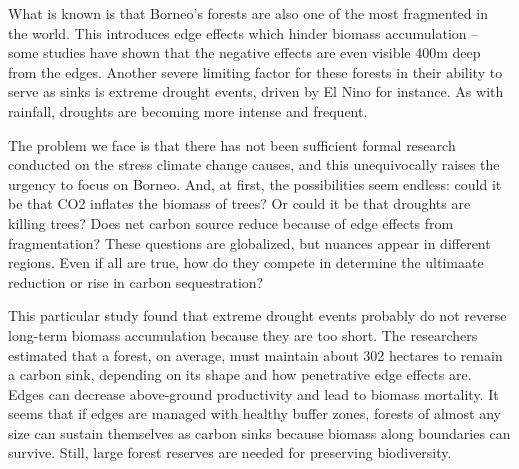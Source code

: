 What is known is that Borneo's forests are also one of the most fragmented in the world. This introduces edge effects which hinder biomass accumulation -- some studies have shown that the negative effects are even visible 400m deep from the edges. Another severe limiting factor for these forests in their ability to serve as sinks is extreme drought events, driven by El Nino for instance. As with rainfall, droughts are becoming more intense and frequent. 

The problem we face is that there has not been sufficient formal research conducted on the stress climate change causes, and this unequivocally raises the urgency to focus on Borneo. And, at first, the possibilities seem endless: could it be that CO2 inflates the biomass of trees? Or could it be that droughts are killing trees? Does net carbon source reduce because of edge effects from fragmentation? These questions are globalized, but nuances appear in different regions. Even if all are true, how do they compete in determine the ultimaate reduction or rise in carbon sequestration?

This particular study found that extreme drought events probably do not reverse long-term biomass accumulation because they are too short. The researchers estimated that a forest, on average, must maintain about 302 hectares to remain a carbon sink, depending on its shape and how penetrative edge effects are. Edges can decrease above-ground productivity and lead to biomass mortality. It seems that if edges are managed with healthy buffer zones, forests of almost any size can sustain themselves as carbon sinks because biomass along boundaries can survive. Still, large forest reserves are needed for preserving biodiversity.

